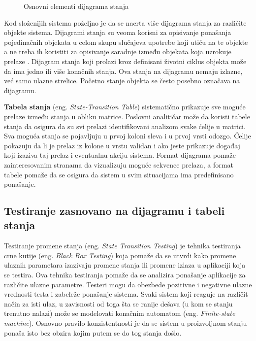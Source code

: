 \documentclass[a4paper]{article}
\begin{document}
\begin{figure} [!h]
 \caption{Osnovni elementi dijagrama stanja}
 \label{fig:dijagram elementi}
\end{figure}

 Kod složenijih sistema poželjno je da se nacrta više dijagrama stanja za različite objekte sistema. Dijagrami stanja su veoma korisni za opisivanje ponašanja pojedinačnih objekata u celom skupu slučajeva upotrebe koji utiču na te objekte a ne treba ih koristiti za opisivanje saradnje između objekata koja uzrokuje prelaze \cite{StateTesting}. Dijagram stanja koji prolazi kroz definisani životni ciklus objekta može da ima jedno ili više konačnih stanja. Ova stanja na dijagramu nemaju izlazne, već samo ulazne strelice. Početno stanje objekta se često posebno označava na dijagramu. 

\textbf{Tabela stanja} (eng. \textit{State-Transition Table}) sistematično prikazuje sve moguće prelaze između stanja u obliku matrice. Poslovni analitičar može da koristi tabele stanja da osigura da su svi prelazi identifikovani analizom svake ćelije u matrici. Sva moguća stanja se pojavljuju u prvoj koloni sleva i u prvoj vrsti odozgo. Ćelije pokazuju da li je prelaz iz kolone u vrstu validan i ako jeste prikazuje događaj koji izaziva taj prelaz i eventualnu akciju sistema. Format dijagrama pomaže zainteresovanim stranama da vizualizuju moguće sekvence prelaza, a format tabele pomaže da se osigura da sistem u svim situacijama ima predefinisano ponašanje. \cite{ModelingSystemStates} 


\subsection{Testiranje zasnovano na dijagramu i tabeli stanja}
\label{sec:testiranje}
Testiranje promene stanja (eng. \textit{State Transition Testing}) je tehnika testiranja crne kutije (eng. \textit{Black Box Testing}) koja pomaže da se utvrdi kako promene ulaznih parametara izazivaju promene stanja ili promene izlaza u aplikaciji koja se testira. Ova tehnika testiranja pomaže da se analizira ponašanje aplikacije za različite ulazne parametre. Testeri mogu da obezbede pozitivne i negativne ulazne vrednosti testa i zabeleže ponašanje sistema. Svaki sistem koji reaguje na različit način za isti ulaz, u zavisnosti od toga šta se ranije dešava (u kom se stanju trenutno nalazi) može se modelovati konačnim automatom (eng. \textit{Finite-state machine}). Osnovno pravilo konzistentnosti je da se sistem u proizvoljnom stanju ponaša isto bez obzira kojim putem se do tog stanja došlo.
\end{document}
